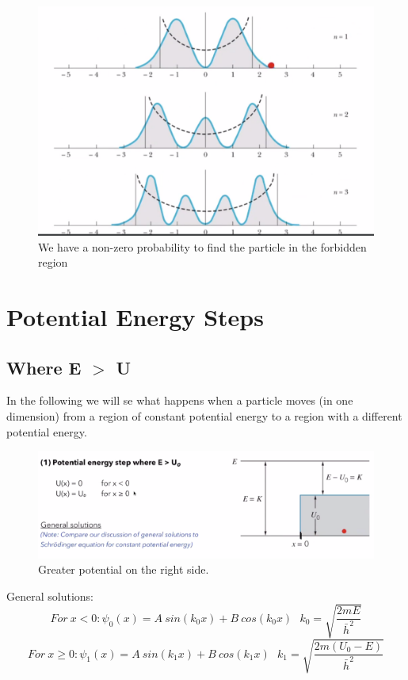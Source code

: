 \documentclass[class=article,crop=false]{standalone}
\begin{document}
\begin{figure}[h!]
	\centering
	\includegraphics[width=.8\linewidth]{./Images/quantum_harmonic_2.png}
	\caption{We have a non-zero probability to find the particle in the forbidden region}
\end{figure}

\newpage
\section{Potential Energy Steps}
\subsection{Where E $>$ U}
In the following we will se what happens when a particle moves (in one dimension) from a region of constant potential energy to a region with a different potential energy.


\begin{figure}[h!]
	\centering
	\includegraphics[width=1\linewidth]{./Images/pe_steps.png}
	\caption{Greater potential on the right side.}
\end{figure}

General solutions:
$$ For\ x<0: \psi_0(x) = A\ sin(k_0x) + B\ cos(k_0x)\ \ \ k_0 = \sqrt{\frac{2mE}{\bar{h}^2}} $$
$$ For\ x\geq0: \psi_1(x) = A\ sin(k_1x) + B\ cos(k_1x)\ \ \ k_1 = \sqrt{\frac{2m(U_0-E)}{\bar{h}^2}} $$
\end{document}
